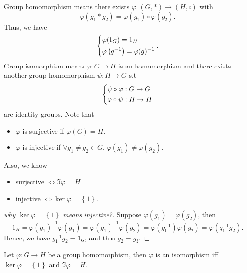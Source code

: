 \begin{prev}
    Group homomorphism means there exists \(\varphi : (G, *) \to (H, \circ )\) with
    \[
        \varphi (g_1 * g_2) = \varphi (g_1) \circ \varphi (g_2).
    \]
    Thus, we have 
    \[
        \begin{dcases}
            \varphi (1_G) = 1_H \\
            \varphi \left( g^{-1} \right) = \varphi (g)^{-1}
        \end{dcases}.
    \]  
        Group isomorphism means \(\varphi: G \to H\) is an homomorphism and there exists another group homomorphism \(\psi : H \to G\) s.t. 
        \[
            \begin{dcases}
                \psi \circ \varphi : G \to G \\
                \varphi \circ \psi : H \to H
            \end{dcases}
        \] are identity groups. Note that 
        \begin{itemize}
            \item \(\varphi \) is surjective if \(\varphi (G) = H\). 
            \item \(\varphi \) is injective if \(\forall g_1 \neq g_2 \in G\), \(\varphi (g_1) \neq \varphi (g_2)\).      
        \end{itemize}
        Also, we know 
        \begin{itemize}
            \item surjective \(\iff \Im \varphi = H\)
            \item injective \(\iff \ker \varphi = \left\{ 1 \right\} \).   
        \end{itemize}
\end{prev}

\begin{proof}[why \(\ker \varphi = \left\{ 1 \right\} \) means injective?]
    Suppose \(\varphi (g_1) = \varphi (g_2)\), then
    \[
        1_H = \varphi (g_1)^{-1}\varphi (g_1) = \varphi (g_1)^{-1} \varphi (g_2) = \varphi \left( g_1^{-1} \right) \varphi (g_2) = \varphi \left( g_1^{-1} g_2 \right).  
    \] 
    Hence, we have \(g_1^{-1} g_2 = 1_G\), and thus \(g_2 = g_2\).  
\end{proof}

\begin{theorem}
    Let \(\varphi :G \to H\) be a group homomorphism, then \(\varphi \) is an isomorphism iff \(\ker \varphi = \left\{ 1 \right\} \) and \(\Im \varphi = H\).     
\end{theorem}
